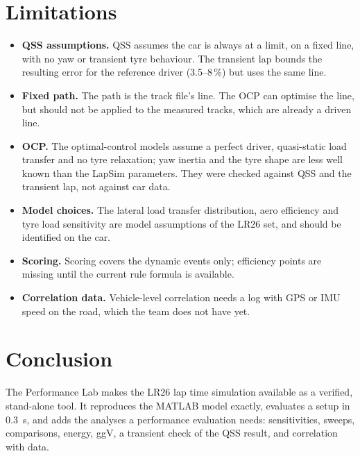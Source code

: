 \documentclass[11pt]{article}
\begin{document}
\section{Limitations}\label{sec:limits}
\begin{itemize}
  \item \textbf{QSS assumptions.} QSS assumes the car is always at a limit, on a fixed line, with no yaw or
        transient tyre behaviour. The transient lap bounds the resulting error for the reference driver (3.5--8\,\%)
        but uses the same line.
  \item \textbf{Fixed path.} The path is the track file's line. The OCP can optimise the line, but should not be
        applied to the measured tracks, which are already a driven line.
  \item \textbf{OCP.} The optimal-control models assume a perfect driver, quasi-static load transfer and no tyre
        relaxation; yaw inertia and the tyre shape are less well known than the LapSim parameters. They were checked
        against QSS and the transient lap, not against car data.
  \item \textbf{Model choices.} The lateral load transfer distribution, aero efficiency and tyre load sensitivity
        are model assumptions of the LR26 set, and should be identified on the car.
  \item \textbf{Scoring.} Scoring covers the dynamic events only; efficiency points are missing until the current
        rule formula is available.
  \item \textbf{Correlation data.} Vehicle-level correlation needs a log with GPS or IMU speed on the road, which
        the team does not have yet.
\end{itemize}

\section{Conclusion}
The Performance Lab makes the LR26 lap time simulation available as a verified, stand-alone tool. It reproduces the
MATLAB model exactly, evaluates a setup in \SI{0.3}{s}, and adds the analyses a performance evaluation needs:
sensitivities, sweeps, comparisons, energy, ggV, a transient check of the QSS result, and correlation with data.
\end{document}
